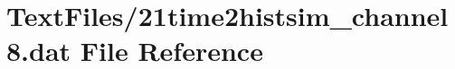 \hypertarget{21time2histsim__channel8_8dat}{}\section{Text\+Files/21time2histsim\+\_\+channel8.dat File Reference}
\label{21time2histsim__channel8_8dat}
